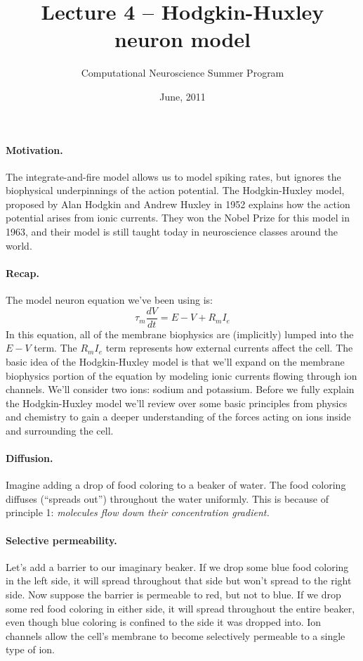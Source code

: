 \documentclass[11pt]{article}
\title{Lecture 4 -- Hodgkin-Huxley neuron model}
\author{Computational Neuroscience Summer Program}
\date{June, 2011}
\begin{document}
\maketitle

\paragraph{Motivation.}  The integrate-and-fire model allows us to model spiking rates, but ignores the biophysical underpinnings of the action potential.  The Hodgkin-Huxley model, proposed by Alan Hodgkin and Andrew Huxley in 1952 explains how the action potential arises from ionic currents.  They won the Nobel Prize for this model in 1963, and their model is still taught today in neuroscience classes around the world.

\paragraph{Recap.}  The model neuron equation we've been using is:
\[
\tau_m\frac{dV}{dt} = E - V + R_mI_e
\]
In this equation, all of the membrane biophysics are (implicitly) lumped into the $E - V$ term.  The $R_mI_e$ term represents how external currents affect the cell.  The basic idea of the Hodgkin-Huxley model is that we'll expand on the membrane biophysics portion of the equation by modeling ionic currents flowing through ion channels.  We'll consider two ions: sodium and potassium.  Before we fully explain the Hodgkin-Huxley model we'll review over some basic principles from physics and chemistry to gain a deeper understanding of the forces acting on ions inside and surrounding the cell.

\paragraph{Diffusion.}  Imagine adding a drop of food coloring to a beaker of water.  The food coloring diffuses (``spreads out'') throughout the water uniformly.  This is because of principle 1: \textit{molecules flow down their concentration gradient.}

\paragraph{Selective permeability.}  Let's add a barrier to our imaginary beaker.  If we drop some blue food coloring in the left side, it will spread throughout that side but won't spread to the right side.  Now suppose the barrier is permeable to red, but not to blue.  If we drop some red food coloring in either side, it will spread throughout the entire beaker, even though blue coloring is confined to the side it was dropped into.  Ion channels allow the cell's membrane to become selectively permeable to a single type of ion.
\end{document}
